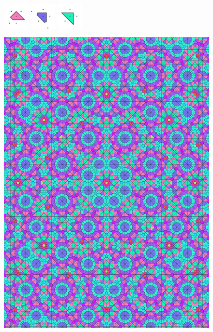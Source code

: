 \documentclass[text.tex]{subfiles}
\begin{document}
\begin{figure}[h!]
\includegraphics[width=0.12\textwidth]{img/results/circle8/circle8_103553_(-10_5alpha_2)_014.pdf}
\includegraphics[width=0.12\textwidth]{img/results/circle8/circle8_103553_(-10_5alpha_2)_015.pdf}
\includegraphics[width=0.12\textwidth]{img/results/circle8/circle8_103553_(-10_5alpha_2)_016.pdf}
\end{figure}

\begin{figure}[h!]
\centering
\includegraphics[width=1\textwidth]{img/results/circle8/quasi_circle_103553_(-10_5alpha_2).pdf}
\end{figure}
\end{document}

